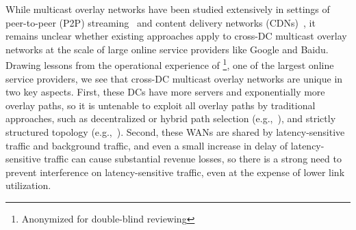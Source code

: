 While multicast overlay networks have been studied extensively 
in settings of peer-to-peer (P2P) streaming~\cite{??,??} and 
content delivery networks (CDNs)~\cite{??,??}, it remains unclear 
whether existing approaches apply to cross-DC multicast overlay 
networks at the scale of large online service providers like 
Google and Baidu. 
Drawing lessons from the operational experience of 
\company\footnote{Anonymized for double-blind reviewing}, one of 
the largest online service providers, we see that cross-DC 
multicast overlay networks are unique in two key aspects.
First, these DCs have more servers and exponentially more overlay 
paths, so it is untenable to exploit all overlay paths by 
traditional approaches, such as decentralized or hybrid path 
selection (e.g.,~\cite{??,??}), and strictly structured topology 
(e.g.,~\cite{akamai}).
Second, these WANs are shared by latency-sensitive traffic and 
background traffic, and even a small increase in delay of
latency-sensitive traffic can cause substantial revenue losses, 
so there is a strong need to prevent interference on 
latency-sensitive traffic, even at the expense of lower link 
utilization.


%

